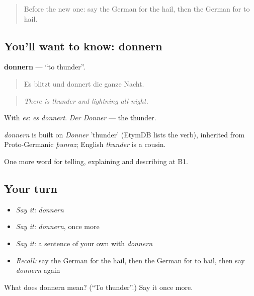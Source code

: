 \begin{quote}
Before the new one: say the German for the hail, then the German for to hail.
\end{quote}

\subsection*{You'll want to know: donnern}
\textbf{donnern} — \textquotedblleft{}to thunder\textquotedblright{}.

\begin{quote}
Es blitzt und donnert die ganze Nacht.
\end{quote}

\begin{quote}
\emph{There is thunder and lightning all night.}
\end{quote}

With \emph{es}: \emph{es donnert}. \emph{Der Donner} — the thunder.

\begin{cousinweb}
\emph{donnern} is built on \emph{Donner} 'thunder' (EtymDB lists the verb), inherited from Proto-Germanic \emph{þunraz}; English \emph{thunder} is a cousin.
\end{cousinweb}

\begin{grammarlens}[title={What you've built}]
One more word for telling, explaining and describing at B1.
\end{grammarlens}

\subsection*{Your turn}
\begin{itemize}
\raggedright
  \item \emph{Say it:} \emph{donnern}
  \item \emph{Say it:} \emph{donnern}, once more
  \item \emph{Say it:} a sentence of your own with \emph{donnern}
  \item \emph{Recall:} say the German for the hail, then the German for to hail, then say \emph{donnern} again
\end{itemize}

\begin{tcolorbox}[breakable,colback=teal!4,colframe=teal!35!black,title={Before you move on}]
What does donnern mean? (\textquotedblleft{}To thunder\textquotedblright{}.) Say it once more.
\end{tcolorbox}
